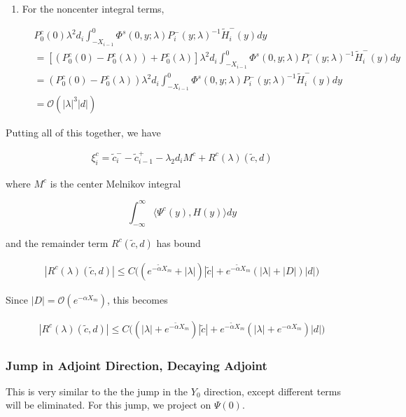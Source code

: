 \documentclass[12pt]{article}
\begin{document}
\begin{enumerate}
\item For the noncenter integral terms,

\begin{align*}
&P_0^c(0) \lambda^2 d_i \int_{-X_{i-1}}^0 \Phi^s(0, y; \lambda) P_i^-(y; \lambda)^{-1} \tilde{H}_i^-(y) dy \\
&= [(P_0^c(0) - P_0^c(\lambda)) + P_0^c(\lambda)] \lambda^2 d_i \int_{-X_{i-1}}^0 \Phi^s(0, y; \lambda) P_i^-(y; \lambda)^{-1} \tilde{H}_i^-(y) dy \\
&= (P_0^c(0) - P_0^c(\lambda)) \lambda^2 d_i \int_{-X_{i-1}}^0 \Phi^s(0, y; \lambda) P_i^-(y; \lambda)^{-1} \tilde{H}_i^-(y) dy \\
&= \mathcal{O}(|\lambda|^3 |d| )
\end{align*}

\end{enumerate}

Putting all of this together, we have

\begin{align*}
\xi^c_i = \tilde{c}_i^- - \tilde{c}_{i-1}^+ - \lambda_2 d_i M^c + R^c(\lambda)(\tilde{c}, d)
\end{align*}

where $M^c$ is the center Melnikov integral

\[
\int_{-\infty}^\infty \langle \Psi^c(y), H(y) \rangle dy 
\]

and the remainder term $R^c(\tilde{c}, d)$ has bound

\begin{align*}
|R^c(\lambda)(\tilde{c}, d)| 
\leq C \Big( (e^{-\tilde{\alpha}X_m} + |\lambda|)|\tilde{c}| + e^{-\tilde{\alpha}X_m}(|\lambda| + |D|)|d| \Big)
\end{align*}

Since $|D| = \mathcal{O}(e^{-\alpha X_m})$, this becomes

\begin{align*}
|R^c(\lambda)(\tilde{c}, d)| 
\leq C \Big( (|\lambda| + e^{-\tilde{\alpha}X_m})|\tilde{c}| + e^{-\tilde{\alpha}X_m}(|\lambda| + e^{-\alpha X_m})|d| \Big)
\end{align*}


\subsubsection*{Jump in Adjoint Direction, Decaying Adjoint}

This is very similar to the the jump in the $Y_0$ direction, except different terms will be eliminated. For this jump, we project on $\Psi(0)$.
\end{document}
